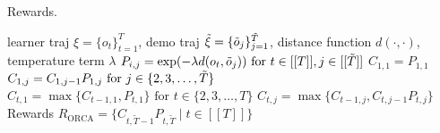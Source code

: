 \begin{algorithm}[tb]
   \caption{\orca{} Rewards.}
   \label{alg:dp_coverage}
    \begin{algorithmic}
        learner traj $\xi = \{o_t\}^{T}_{t=1}$, demo traj $\tilde{\xi} = \{\tilde{o}_{j}\}^{\tilde{T}}_{j=1}$, distance function $d(\cdot, \cdot)$, temperature term $\lambda$
       \STATE {}
       \STATE $P_{i,j}=\exp(-\lambda d(o_t, \tilde{o}_{j})) \text{ for } t \in [[T]], j \in [[\tilde{T}]]$
       \STATE {}
       \STATE $C_{1, 1} = P_{1,1}$
       \STATE $C_{1, j} = C_{1, j-1} P_{1, j} \text{ for } j \in \{2, 3, \ldots, \tilde{T}\}$
       \STATE {}
        \STATE $C_{t, 1} = \max\{C_{t-1, 1}, P_{t, 1}\} \text{ for } t \in \{2, 3, \ldots, T\}$
       \STATE {}
       \STATE $C_{t,j} = \max\{C_{t-1,j}, C_{t,j-1}P_{t,j}\}$
       \ENDFOR
       \ENDFOR
       \STATE {}
        Rewards $R_\text{ORCA} = \{C_{t, \tilde{T}-1}P_{t, \tilde{T}} \mid t \in [[T]]\}$ 
    \end{algorithmic} 
\end{algorithm}
